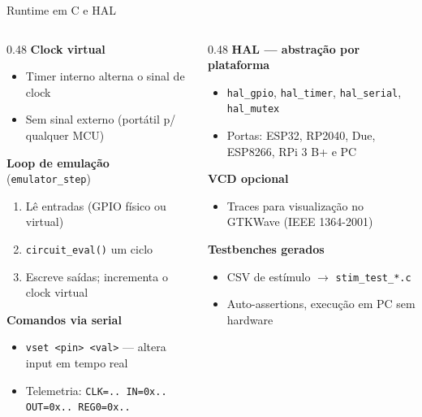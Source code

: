 \documentclass[10pt, aspectratio=169]{beamer}
\newcommand{\code}[1]{\texttt{\small #1}}
\begin{document}
\begin{frame}{Runtime em C e HAL}
  \begin{columns}[t]
    \begin{column}{0.48\textwidth}
      \small
      \textbf{Clock virtual}
      \begin{itemize}
        \item Timer interno alterna o sinal de clock
        \item Sem sinal externo (portátil p/ qualquer MCU)
      \end{itemize}
      \textbf{Loop de emulação} (\code{emulator\_step})
      \begin{enumerate}
        \item Lê entradas (GPIO físico ou virtual)
        \item \code{circuit\_eval()} um ciclo
        \item Escreve saídas; incrementa o clock virtual
      \end{enumerate}
      \textbf{Comandos via serial}
      \begin{itemize}
        \item \code{vset <pin> <val>} --- altera input em tempo real
        \item Telemetria: \code{CLK=.. IN=0x.. OUT=0x.. REG0=0x..}
      \end{itemize}
    \end{column}
    \begin{column}{0.48\textwidth}
      \small
      \textbf{HAL --- abstração por plataforma}
      \begin{itemize}
        \item \code{hal\_gpio}, \code{hal\_timer}, \code{hal\_serial},
          \code{hal\_mutex}
        \item Portas: ESP32, RP2040, Due, ESP8266, RPi 3 B+ e PC
      \end{itemize}
      \textbf{VCD opcional}
      \begin{itemize}
        \item Traces para visualização no GTKWave (IEEE 1364-2001)
      \end{itemize}
      \textbf{Testbenches gerados}
      \begin{itemize}
        \item CSV de estímulo $\to$ \code{stim\_test\_*.c}
        \item Auto-assertions, execução em PC sem hardware
      \end{itemize}
    \end{column}
  \end{columns}
\end{frame}
\end{document}
